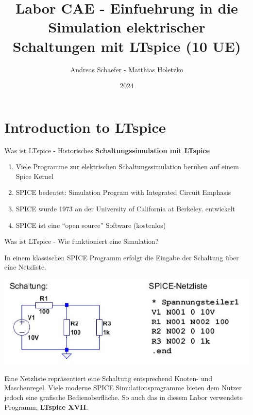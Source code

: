 \documentclass{beamer}
\title{Labor CAE - Einfuehrung in die Simulation elektrischer
Schaltungen mit LTspice (10 UE)}
\date{2024}
\author{Andreas Schaefer - Matthias Holetzko}
\institute{Duale Hochschule Baden-Württemberg  \newline -- \newline Fakultät Technik \newline Studiengang Mechatronik}
\begin{document}
\maketitle
\section{Introduction to LTspice}

\begin{frame}{Was ist LTspice - Historisches}
  \textbf{Schaltungssimulation mit LTspice}\newline
  \begin{enumerate}
    \item Viele Programme zur elektrischen Schaltungssimulation beruhen auf einem Spice Kernel
    \item SPICE bedeutet: Simulation Program with Integrated Circuit Emphasis
    \item SPICE wurde 1973 an der University of California at Berkeley. entwickelt
    \item SPICE ist eine “open source” Software (kostenlos)
  \end{enumerate}
\end{frame}

\begin{frame}[fragile]{Was ist LTspice - Wie funktioniert eine Simulation?}

  In einem klassischen SPICE Programm erfolgt die Eingabe der Schaltung über eine
  Netzliste.
  \begin{center}
    \includegraphics[scale=0.5]{pictures/page1.jpg}
  \end{center}

  Eine Netzliste repräsentiert eine Schaltung entsprechend Knoten- und Maschenregel. \newline Viele moderne SPICE Simulationsprogramme
  bieten dem Nutzer jedoch eine grafische Bedienoberfläche.
  So auch das in diesem Labor verwendete Programm, \textbf{LTspice XVII}.


\end{frame}
\end{document}

